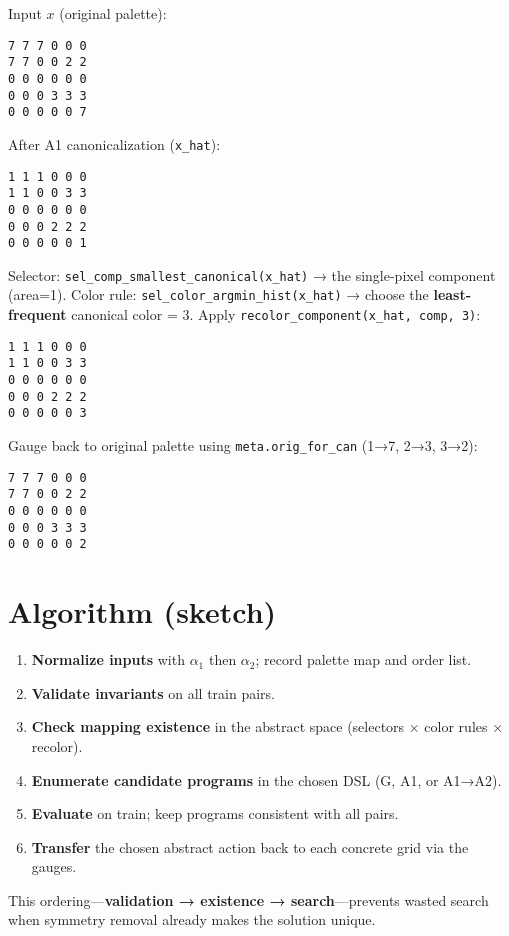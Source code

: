 \documentclass[11pt]{article}
\newcommand{\code}[1]{\texttt{#1}}
\begin{document}
Input $x$ (original palette):

\begin{lstlisting}
7 7 7 0 0 0
7 7 0 0 2 2
0 0 0 0 0 0
0 0 0 3 3 3
0 0 0 0 0 7
\end{lstlisting}

After A1 canonicalization (\code{x\_hat}):

\begin{lstlisting}
1 1 1 0 0 0
1 1 0 0 3 3
0 0 0 0 0 0
0 0 0 2 2 2
0 0 0 0 0 1
\end{lstlisting}

Selector: \code{sel\_comp\_smallest\_canonical(x\_hat)} → the single-pixel component (area=1).  
Color rule: \code{sel\_color\_argmin\_hist(x\_hat)} → choose the \textbf{least-frequent} canonical color = 3.  
Apply \code{recolor\_component(x\_hat, comp, 3)}:

\begin{lstlisting}
1 1 1 0 0 0
1 1 0 0 3 3
0 0 0 0 0 0
0 0 0 2 2 2
0 0 0 0 0 3
\end{lstlisting}

Gauge back to original palette using \code{meta.orig\_for\_can} (1→7, 2→3, 3→2):

\begin{lstlisting}
7 7 7 0 0 0
7 7 0 0 2 2
0 0 0 0 0 0
0 0 0 3 3 3
0 0 0 0 0 2
\end{lstlisting}

\section{Algorithm (sketch)}

\begin{enumerate}
\item \textbf{Normalize inputs} with $\alpha_1$ then $\alpha_2$; record palette map and order list.
\item \textbf{Validate invariants} on all train pairs.
\item \textbf{Check mapping existence} in the abstract space (selectors $\times$ color rules $\times$ recolor).
\item \textbf{Enumerate candidate programs} in the chosen DSL (G, A1, or A1→A2).
\item \textbf{Evaluate} on train; keep programs consistent with all pairs.
\item \textbf{Transfer} the chosen abstract action back to each concrete grid via the gauges.
\end{enumerate}

This ordering---\textbf{validation → existence → search}---prevents wasted search when symmetry removal already makes the solution unique.
\end{document}
